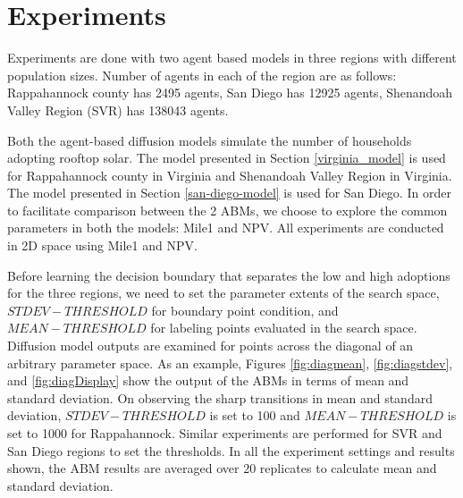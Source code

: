 \section{Experiments}
\label{sec:experiments}
Experiments are done with two agent based models in three regions with different population sizes. Number of agents in each of the region are as follows: Rappahannock county has 2495 agents, San Diego has 12925 agents, Shenandoah Valley Region (SVR) has 138043 agents. 

Both the agent-based diffusion models simulate the number of households adopting rooftop solar.
The model presented in Section \ref{virginia_model} is used for Rappahannock county in Virginia and Shenandoah Valley Region in Virginia. 
The model presented in Section \ref{san-diego-model} is used for San Diego.
In order to facilitate comparison between the 2 ABMs, we choose to explore the common parameters in both the models: Mile1 and NPV. All experiments are conducted in 2D space using Mile1 and NPV.

Before learning the decision boundary that separates the low and high adoptions for the three regions, we need to set the parameter extents of the search space, $STDEV-THRESHOLD$ for boundary point condition, and $MEAN-THRESHOLD$ for labeling points evaluated in the search space. Diffusion model outputs are examined for points across the diagonal of an arbitrary parameter space. As an example, Figures \ref{fig:diagmean}, \ref{fig:diagstdev}, and \ref{fig:diagDisplay} show the output of the ABMs in terms of mean and standard deviation. On observing the sharp transitions in mean and standard deviation, $STDEV-THRESHOLD$ is set to 100 and $MEAN-THRESHOLD$ is set to 1000 for Rappahannock. Similar experiments are performed for SVR and San Diego regions to set the thresholds.
In all the experiment settings and results shown, the ABM results are averaged over 20 replicates to calculate mean and standard deviation. 




